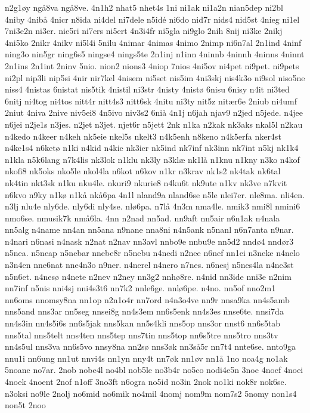 {n2g1øy
ngå8va
ngå8ve.
4n1h2
nhat5
nhet4s
1ni
ni1ak
ni1a2n
nian5dep
ni2bl
4niby
4nibå
4nicr
n8ida
ni4del
ni7dele
n5idé
ni6do
nid7r
nids4
nid5st
4nieg
ni1el
7ni3e2n
ni3er.
nie5ri
ni7ers
ni5ert
4n3i4fr
ni5gla
ni9glo
2nih
8nij
ni3ke
2nikj
4ni5ko
2nikr
4nikv
ni5l4i
5nilu
4nimar
4nimas
4nimo
2nimp
ni6n7al
2n1ind
4ninf
ning3o
nin5gr
ning6s5
ningse4
nings5te
2n1inj
n1inn
4ninnb
4ninnh
4ninns
4ninnt
2n1ins
2n1int
2ninv
5nio.
nion2
nions3
4niop
7nios
4ni5ov
ni4pet
ni9pet.
ni9pets
ni2pl
nip3li
nip5si
4nir
nir7kel
4nisem
ni5set
nis5im
4ni3skj
nis4k3o
ni9sol
niso5ne
niss4
4nistas
6nistat
nis5tik
4nistil
ni3str
4nisty
4nistø
6nisu
6nisy
n4it
ni3ted
6nitj
ni4tog
ni4tos
nitt4r
nitt4s3
nitt6sk
4nitu
ni3ty
nit5z
nitær6e
2niub
ni4umf
2niut
4niva
2nive
niv5ei8
4n5ivo
niv3s2
6niå
4n1j
n6jah
njav9
n2jed
n5jede.
n4jee
n6jei
n2je1s
n3jes.
n2jet
n3jet.
njet6r
n5jett
2nk
n1ka
n2kak
nk3aks
nkal5l
n2kau
n4kedo
n4keer
n4keh
nk5eie
nkel5s
nkelt3
n4k5enh
n8keno
n4k5erfa
nker4st
n4ke1s4
n6ketø
n1ki
n4kid
n4kie
nk3ier
nk5ind
nk7inf
nk3inn
nk7int
n5kj
nk1k4
n1kla
n5k6lang
n7k4lis
nk3lok
n1klu
nk3ly
n3klæ
nk1lå
n1knu
n1kny
n3ko
n4kof
nkofi8
nk5oks
nko5le
nkol4la
n6kot
n6kov
n1kr
n3krav
nk1s2
nk4tak
nk6tal
nk4tin
nkt3sk
n1ku
nku4le.
nkuri9
nkurie8
n4ku6t
nk9ute
n1kv
nk3ve
n7kvit
n6kvo
n9ky
n1kø
n1kå
nkå6pa
4n1l
nland9a
nland6se
n5le
nlei7er.
nle8ma.
nli4en.
n3lj
nlu4e
nly6de.
nly6di
nly4se.
nlø6pa.
n7lå
4n3m
nma4le.
nmik3
nmi8l
nmini6
nmo6se.
nmusik7k
nmå6la.
4nn
n2nad
nn5ad.
nn9aft
nn5air
n6n1ak
n4nala
nn5alg
n4name
nn4an
nn5ana
n9nane
nna8ni
n4n5ank
n5nanl
n6n7anta
n9nar.
n4nari
n6nasi
n4nask
n2nat
n2nav
nn3avl
nnbo9e
nnbu9e
nn5d2
nndø4
nndør3
n5nea.
n5neap
n5nebar
nnebe8r
n5nebu
n4nedi
n2nee
n6nef
nn1ei
n3neke
n4nelo
n3n4en
nne6nat
nne4n3o
n9ner.
n4nerel
n4nero
n7nes.
n6nesj
n5nes4la
n4ne3st
n5n6et.
n4nesø
n4nete
n2nev
n2ney
nn3g2
nnhø8re.
n4nid
nn3ide
nni3e
n2nim
nn7inf
n5nis
nni4sj
nni4s3t6
nn7k2
nnle6ge.
nnlø6pe.
n4no.
nn5of
nno2m1
nn6oms
nnomsy8na
nn1op
n2n1o4r
nn7ord
n4n3o4ve
nn9r
nnsa9ka
nn4s5amb
nns5and
nns3ar
nn5seg
nnsei8g
nn4s3em
nn6s5enk
nn4s3es
nnse6te.
nnsi7da
nn4s3in
nn4s5i6s
nn6s5jak
nns5kan
nn5s4kli
nns5op
nns3or
nnst6
nn6s5tab
nns5tal
nns5telt
nns4ten
nns5tep
nns7tin
nns5top
nn6s5tre
nns5tro
nns3tv
nn4s5ul
nns3va
nn6s5vo
nnsy8na
nn2sø
nns3øk
nn3så5r
nn7t4
nnte6se.
nnto9ga
nnu1i
nn6ung
nn1ut
nnvi4s
nn1yn
nny4t
nn7øk
nn1øv
nn1å
1no
noa4g
no1ak
5noane
no7ar.
2nob
nobe4l
no4bl
nob5le
no3b4r
no5co
nodi4e5n
3noe
4noef
4noei
4noek
4noent
2nof
n1off
3no3ft
n6ogra
no5id
no3in
2nok
no1ki
nok8r
nok6se.
n3oksi
no9le
2nolj
no6mid
no6mik
no4mil
4nomj
nom9m
nom7s2
5nomy
non1s4
non5t
2noo
}
